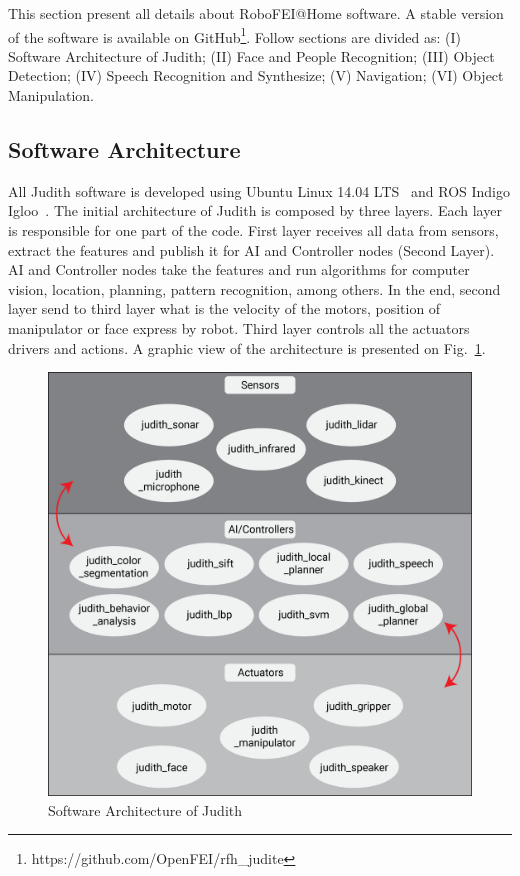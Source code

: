 This section present all details about RoboFEI@Home software. A stable version of the software is available on GitHub\footnote{https://github.com/OpenFEI/rfh\_judite}. Follow sections are divided as: (I) Software Architecture of Judith; (II) Face and People Recognition; (III) Object Detection; (IV) Speech Recognition and Synthesize; (V) Navigation; (VI) Object Manipulation.

\subsection{Software Architecture}\label{architecture}
All Judith software is developed using Ubuntu Linux 14.04 LTS~\cite{sobell:2014} and ROS Indigo Igloo~\cite{ros:2015}. The initial architecture of Judith is composed by three layers. Each layer is responsible for one part of the code. First layer receives all data from sensors, extract the features and publish it for AI and Controller nodes (Second Layer). AI and Controller nodes take the features and run algorithms for computer vision, location, planning, pattern recognition, among others. In the end, second layer send to third layer what is the velocity of the motors, position of manipulator or face express by robot. Third layer controls all the actuators drivers and actions. A graphic view of the architecture is presented on Fig.~\ref{fig:architecture}.

\begin{figure}[ht!]
    \centering
    \includegraphics[width = \textwidth]{figures/architecture.png}
    \caption{Software Architecture of Judith}
    \label{fig:architecture}
\end{figure}

